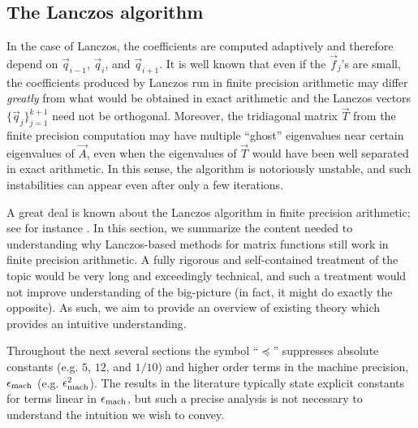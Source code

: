 \subsection{The Lanczos algorithm}

In the case of Lanczos, the coefficients are computed adaptively and therefore depend on \( \vec{q}_{i-1} \), \( \vec{q}_i \), and \( \vec{q}_{i+1} \).
It is well known that even if the \( \vec{f}_j \)'s are small, the coefficients produced by Lanczos run in finite precision arithmetic may differ \emph{greatly} from what would be obtained in exact arithmetic and the Lanczos vectors \( \{ \vec{q}_j \}_{j=1}^{k+1} \) need not be orthogonal. 
Moreover, the tridiagonal matrix \( \vec{T} \) from the finite precision computation may have multiple ``ghost'' eigenvalues near certain eigenvalues of $\vec{A}$, even when the eigenvalues of \( \vec{T} \) would have been well separated in exact arithmetic.
In this sense, the algorithm is notoriously unstable, and such instabilities can appear even after only a few iterations.


A great deal is known about the Lanczos algorithm in finite precision arithmetic; see for instance \cite{greenbaum_97,meurant_strakos_06,meurant_06}.
In this section, we summarize the content needed to understanding why Lanczos-based methods for matrix functions still work in finite precision arithmetic. 
A fully rigorous and self-contained treatment of the topic would be very long and exceedingly technical, and such a treatment would not improve understanding of the big-picture (in fact, it might do exactly the opposite).
As such, we aim to provide an overview of existing theory which provides an intuitive understanding.

Throughout the next several sections the symbol ``\( \preceq \)'' suppresses absolute constants (e.g. \( 5 \), \( 12 \), and \( 1/10 \)) and higher order terms in the machine precision, \( \epsilon_{\textup{mach}} \) (e.g. \( \epsilon_{\textup{mach}}^2 \)).
The results in the literature typically state explicit constants for terms linear in \( \epsilon_{\textup{mach}} \), but such a precise analysis is not necessary to understand the intuition we wish to convey.

